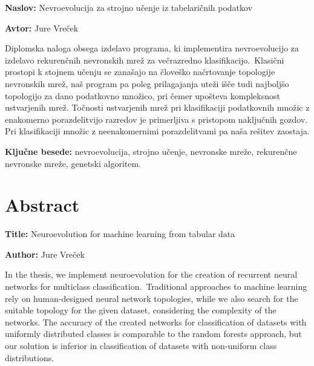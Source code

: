 \documentclass[a4paper,12pt,openright]{book}
\newcommand{\ttitle}{Nevroevolucija za strojno učenje iz tabelaričnih podatkov}
\newcommand{\ttitleEn}{Neuroevolution for machine learning from tabular data}
\newcommand{\tauthor}{Jure Vreček}
\newcommand{\tkeywords}{nevroevolucija, strojno učenje, nevronske mreže, rekurenčne nevronske mreže, genetski algoritem}
\newcommand{\clearemptydoublepage}{\newpage{\pagestyle{empty}\cleardoublepage}}
\begin{document}
    \noindent\textbf{Naslov:} \ttitle
    \bigskip

    \noindent\textbf{Avtor:} \tauthor
    \bigskip

    \noindent
    Diplomska naloga obsega izdelavo programa, ki implementira nevroevolucijo za izdelavo rekurenčnih nevronskih mrež za večrazredno
    klasifikacijo.\ Klasični prostopi k stojnem učenju se zanašajo na človeško načrtovanje topologije nevronskih mrež, naš
    program pa poleg prilagajanja uteži išče tudi najboljšo topologijo za dano podatkovno množico, pri čemer upošteva
    kompleksnost ustvarjenih mrež.
    Točnosti ustvarjenih mrež pri klasifikaciji podatkovnih množic z enakomerno porazdelitvijo razredov je primerljiva
    s pristopom naključnih gozdov.
    Pri klasifikaciji množic z neenakomernimi porazdelitvami pa naša rešitev zaostaja.

    \bigskip

    \noindent\textbf{Ključne besede:} \tkeywords.
    \clearemptydoublepage

    \chapter*{Abstract}

    \noindent\textbf{Title:} \ttitleEn
    \bigskip

    \noindent\textbf{Author:} \tauthor
    \bigskip

    \noindent
    In the thesis, we implement neuroevolution for the creation of recurrent neural networks
    for multiclass classification.\ Traditional approaches to machine learning rely on human-designed neural network
    topologies, while we also search for the suitable topology for the given dataset, considering
    the complexity of the networks.
    The accuracy of the created networks for classification of datasets with uniformly
    distributed classes is comparable to the random forests approach, but our solution is inferior in classification of
    datasets with non-uniform class distributions.
    \bigskip
\end{document}
